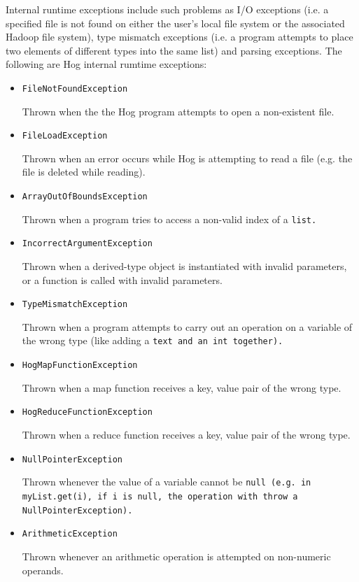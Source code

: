 \documentclass{article}
\begin{document}
Internal run­time exceptions include such problems as I/O exceptions (i.e. a specified file is not found on either the user’s
local file system or the associated Hadoop file system), type mismatch exceptions (i.e. a program attempts to place two
elements of different types into the same list) and parsing exceptions. The following are Hog internal rum­time exceptions:


\begin{itemize}
  \item[] \tt FileNotFoundException \rm
  
  Thrown when the the Hog program attempts to open a non-existent file.
  
  \item[] \tt FileLoadException \rm
  
  Thrown when an error occurs while Hog is attempting to read a file (e.g. the file is deleted while reading).
  
  \item[] \tt ArrayOutOfBoundsException \rm
  
  Thrown when a program tries to access a non-valid index of a \tt list\rm.
  
  \item[] \tt IncorrectArgumentException \rm
  
  Thrown when a derived-type object is instantiated with invalid parameters, or a function is called with invalid parameters.
  
  \item[] \tt TypeMismatchException \rm
  
  Thrown when a program attempts to carry out an operation on a variable of the wrong type (like adding a \tt text \rm and an
  \tt int \rm together).
  
  \item[] \tt HogMapFunctionException \rm
  
  Thrown when a map function receives a key, value pair of the wrong type.
  
  \item[] \tt HogReduceFunctionException \rm
  
  Thrown when a reduce function receives a key, value pair of the wrong type.
  
  \item[] \tt NullPointerException \rm
  
  Thrown whenever the value of a variable cannot be \tt null \rm (e.g. in \tt myList.get(i)\rm, if \tt i \rm is \tt null\rm,
  the operation with throw a \tt NullPointerException\rm).
  
  \item[] \tt ArithmeticException \rm
  
  Thrown whenever an arithmetic operation is attempted on non-numeric operands.
  
\end{itemize}
\end{document}

